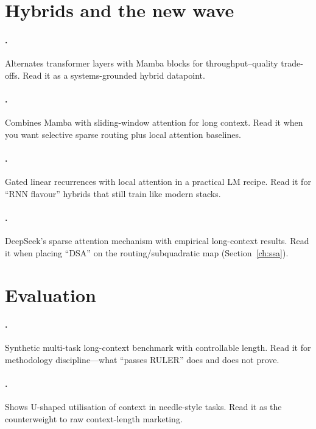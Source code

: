 \section*{Hybrids and the new wave}

\paragraph{\citet{lieber2024jamba}.}
Alternates transformer layers with Mamba blocks for throughput--quality trade-offs.
Read it as a systems-grounded hybrid datapoint.

\paragraph{\citet{ren2024samba}.}
Combines Mamba with sliding-window attention for long context. Read it when you
want selective sparse routing plus local attention baselines.

\paragraph{\citet{de2024griffin}.}
Gated linear recurrences with local attention in a practical LM recipe. Read it
for ``RNN flavour'' hybrids that still train like modern stacks.

\paragraph{\citet{deepseek2024dsa}.}
DeepSeek's sparse attention mechanism with empirical long-context results. Read
it when placing ``DSA'' on the routing/subquadratic map (Section~\ref{ch:ssa}).

\section*{Evaluation}

\paragraph{\citet{hsieh2024ruler}.}
Synthetic multi-task long-context benchmark with controllable length. Read it
for methodology discipline---what ``passes RULER'' does and does not prove.

\paragraph{\citet{liu2024lostmiddle}.}
Shows U-shaped utilisation of context in needle-style tasks. Read it as the
counterweight to raw context-length marketing.

